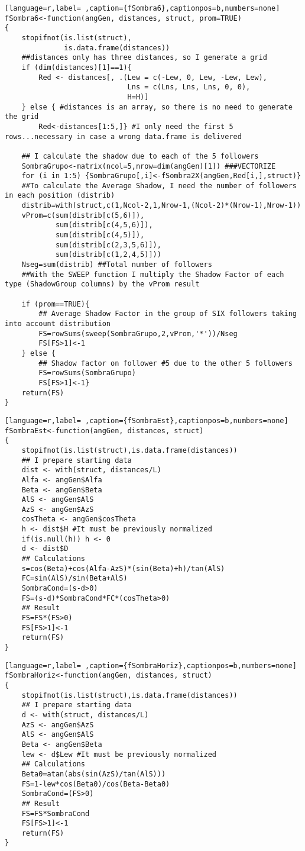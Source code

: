 \begin{lstlisting}[language=r,label= ,caption={fSombra6},captionpos=b,numbers=none]
fSombra6<-function(angGen, distances, struct, prom=TRUE)
{
    stopifnot(is.list(struct),
              is.data.frame(distances))
    ##distances only has three distances, so I generate a grid
    if (dim(distances)[1]==1){ 
        Red <- distances[, .(Lew = c(-Lew, 0, Lew, -Lew, Lew),
                             Lns = c(Lns, Lns, Lns, 0, 0),
                             H=H)]
    } else { #distances is an array, so there is no need to generate the grid
        Red<-distances[1:5,]} #I only need the first 5 rows...necessary in case a wrong data.frame is delivered

    ## I calculate the shadow due to each of the 5 followers
    SombraGrupo<-matrix(ncol=5,nrow=dim(angGen)[1]) ###VECTORIZE
    for (i in 1:5) {SombraGrupo[,i]<-fSombra2X(angGen,Red[i,],struct)}
    ##To calculate the Average Shadow, I need the number of followers in each position (distrib)
    distrib=with(struct,c(1,Ncol-2,1,Nrow-1,(Ncol-2)*(Nrow-1),Nrow-1)) 
    vProm=c(sum(distrib[c(5,6)]),
            sum(distrib[c(4,5,6)]),
            sum(distrib[c(4,5)]),
            sum(distrib[c(2,3,5,6)]),
            sum(distrib[c(1,2,4,5)]))
    Nseg=sum(distrib) ##Total number of followers
    ##With the SWEEP function I multiply the Shadow Factor of each type (ShadowGroup columns) by the vProm result

    if (prom==TRUE){
        ## Average Shadow Factor in the group of SIX followers taking into account distribution
        FS=rowSums(sweep(SombraGrupo,2,vProm,'*'))/Nseg
        FS[FS>1]<-1
    } else {		
        ## Shadow factor on follower #5 due to the other 5 followers
        FS=rowSums(SombraGrupo)
        FS[FS>1]<-1}
    return(FS)
}
\end{lstlisting}
\begin{lstlisting}[language=r,label= ,caption={fSombraEst},captionpos=b,numbers=none]
fSombraEst<-function(angGen, distances, struct)
{
    stopifnot(is.list(struct),is.data.frame(distances))
    ## I prepare starting data
    dist <- with(struct, distances/L)
    Alfa <- angGen$Alfa
    Beta <- angGen$Beta
    AlS <- angGen$AlS
    AzS <- angGen$AzS
    cosTheta <- angGen$cosTheta
    h <- dist$H #It must be previously normalized
    if(is.null(h)) h <- 0
    d <- dist$D                   
    ## Calculations
    s=cos(Beta)+cos(Alfa-AzS)*(sin(Beta)+h)/tan(AlS)
    FC=sin(AlS)/sin(Beta+AlS)
    SombraCond=(s-d>0)
    FS=(s-d)*SombraCond*FC*(cosTheta>0)
    ## Result
    FS=FS*(FS>0)
    FS[FS>1]<-1
    return(FS)
}
\end{lstlisting}
\begin{lstlisting}[language=r,label= ,caption={fSombraHoriz},captionpos=b,numbers=none]
fSombraHoriz<-function(angGen, distances, struct)
{
    stopifnot(is.list(struct),is.data.frame(distances))
    ## I prepare starting data 	
    d <- with(struct, distances/L)
    AzS <- angGen$AzS
    AlS <- angGen$AlS
    Beta <- angGen$Beta
    lew <- d$Lew #It must be previously normalized
    ## Calculations
    Beta0=atan(abs(sin(AzS)/tan(AlS)))
    FS=1-lew*cos(Beta0)/cos(Beta-Beta0)
    SombraCond=(FS>0)
    ## Result
    FS=FS*SombraCond
    FS[FS>1]<-1
    return(FS)
}
\end{lstlisting}
